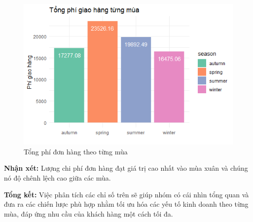 \begin{figure}[!ht]
    \centering \includegraphics[width=15cm]{Images/img/4.3_plotting_data/2-delivery_charge.png}
    \caption{Tổng phí đơn hàng theo từng mùa}
\end{figure}
\textbf{Nhận xét:} Lượng chi phí đơn hàng đạt giá trị cao nhất vào mùa xuân và chúng nó độ chênh lệch cao giữa các mùa.

\textbf{Tổng kết:} Việc phân tích các chỉ số trên sẽ giúp nhóm có cái nhìn tổng quan và đưa ra các chiến lược phù hợp nhằm tối ưu hóa các yếu tố kinh doanh theo từng mùa, đáp ứng nhu cầu của khách hàng một cách tối đa.

